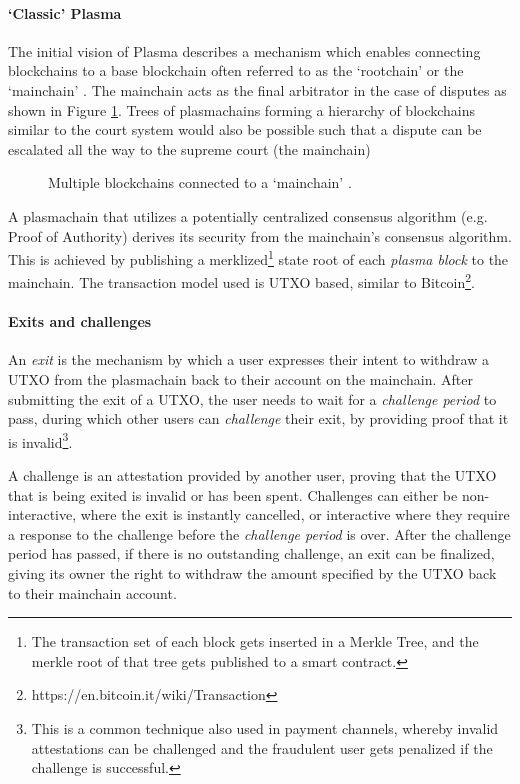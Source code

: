 \paragraph{`Classic' Plasma} \label{ch2:classic_plasma}
The initial vision of Plasma describes a mechanism which enables connecting
blockchains to a base blockchain often referred to as the `rootchain' or the
`mainchain' \cite{plasma}. The mainchain acts as the final arbitrator in
the case of disputes as shown in Figure \ref{fig:many-chains}. Trees of plasmachains forming a hierarchy of blockchains similar to the court system would also be possible such that a dispute can be escalated all the way to the supreme court (the mainchain)

\begin{figure}[H]
    \caption{
        Multiple blockchains connected to a `mainchain' \cite{plasma}.
    }
    \label{fig:many-chains}
\end{figure}

A plasmachain that utilizes a potentially centralized consensus algorithm (e.g. Proof of Authority) derives its security from the mainchain's consensus algorithm. This is achieved by publishing a merklized\footnote{The transaction set of each block gets inserted in a Merkle Tree, and the merkle root of that tree gets published to a smart contract.} state root of each \textit{plasma block} to the mainchain. The transaction model used is UTXO based, similar to Bitcoin\footnote{https://en.bitcoin.it/wiki/Transaction}.

\paragraph{Exits and challenges} An \textit{exit} is the mechanism by which a user expresses
their intent to withdraw a UTXO from the plasmachain back to their account on
the mainchain. After submitting the exit of a UTXO, the user needs to wait for
a \textit{challenge period} to pass, during which other users can \textit{challenge}
their exit, by providing proof that it is invalid\footnote{This is a common technique also used in payment channels, whereby invalid attestations can be challenged and the fraudulent user gets penalized if the challenge is successful.}. 

A challenge is an attestation provided by another user, proving that the UTXO
that is being exited is invalid or has been spent. Challenges can either be
non-interactive, where the exit is instantly cancelled, or interactive where
they require a response to the challenge before the \textit{challenge period} is over. 
After the challenge period has passed, if there is no outstanding challenge, 
an exit can be finalized, giving its owner the right to withdraw the amount 
specified by the UTXO back to their mainchain account. 

